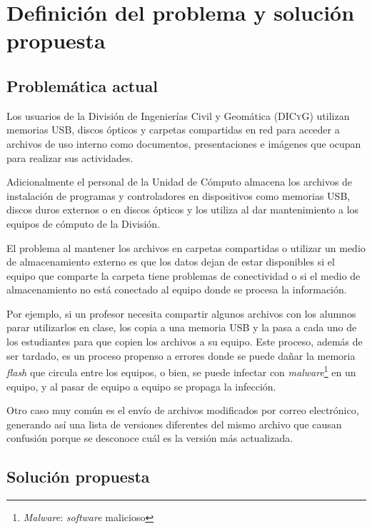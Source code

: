 {
  \linespread{1}
  \cleardoublepage  
  \chapter{Definici\'{o}n del problema y soluci\'{o}n propuesta}
  \label{chap:cap2}
}

    \section {Problem\'{a}tica actual}

Los usuarios de la Divisi\'{o}n de Ingenier\'{i}as Civil y Geom\'{a}tica (\textsc{DICyG}) utilizan memorias \textsc{USB}, discos \'{o}pticos y carpetas compartidas en red para acceder a archivos de uso interno como documentos, presentaciones e im\'{a}genes que ocupan para realizar sus actividades.

Adicionalmente el personal de la Unidad de C\'{o}mputo almacena los archivos de instalaci\'{o}n de programas y controladores en dispositivos como memorias \textsc{USB}, discos duros externos o en discos \'{o}pticos y los utiliza al dar mantenimiento a los equipos de c\'{o}mputo de la Divisi\'{o}n.

El problema al mantener los archivos en carpetas compartidas o utilizar un medio de almacenamiento externo es que los datos dejan de estar disponibles si el equipo que comparte la carpeta tiene problemas de conectividad o si el medio de almacenamiento no est\'{a} conectado al equipo donde se procesa la informaci\'{o}n.

Por ejemplo, si un profesor necesita compartir algunos archivos con los alumnos parar utilizarlos en clase, los copia a una memoria \textsc{USB} y la pasa a cada uno de los estudiantes para que copien los archivos a su equipo. Este proceso, adem\'{a}s de ser tardado, es un proceso propenso a errores donde se puede da\~{n}ar la memoria \textit{flash} que circula entre los equipos, o bien, se puede infectar con \textit{malware}\footnote{\textit{Malware}: \emph{\gls{software}} malicioso} en un equipo, y al pasar de equipo a equipo se propaga la infecci\'{o}n.

Otro caso muy com\'{u}n es el env\'{i}o de archivos modificados por correo electr\'{o}nico, generando as\'{i} una lista de versiones diferentes del mismo archivo que causan confusi\'{o}n porque se desconoce cu\'{a}l es la versi\'{o}n m\'{a}s actualizada.

    \section {Soluci\'{o}n propuesta}

